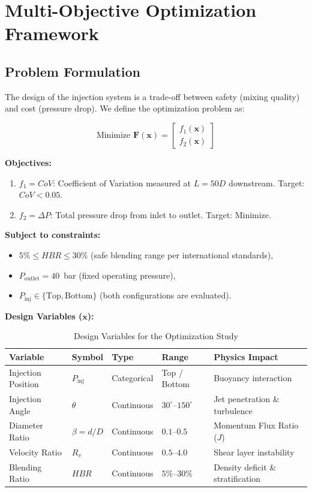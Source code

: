 \documentclass[12pt, a4paper]{report}
\begin{document}
\chapter{Multi-Objective Optimization Framework}

\section{Problem Formulation}
The design of the injection system is a trade-off between safety (mixing quality) and cost (pressure drop). We define the optimization problem as:

\begin{equation}
    \text{Minimize } \mathbf{F}(\mathbf{x}) = \begin{bmatrix} f_1(\mathbf{x}) \\ f_2(\mathbf{x}) \end{bmatrix}
\end{equation}

\noindent \textbf{Objectives:}
\begin{enumerate}
    \item $f_1 = CoV$: Coefficient of Variation measured at $L = 50D$ downstream. Target: $CoV < 0.05$.
    \item $f_2 = \Delta P$: Total pressure drop from inlet to outlet. Target: Minimize.
\end{enumerate}

\noindent \textbf{Subject to constraints:}
\begin{itemize}
    \item $5\% \leq HBR \leq 30\%$ (safe blending range per international standards),
    \item $P_{\text{outlet}} = 40$~bar (fixed operating pressure),
    \item $P_{\text{inj}} \in \{\text{Top}, \text{Bottom}\}$ (both configurations are evaluated).
\end{itemize}

\noindent \textbf{Design Variables ($\mathbf{x}$):}
\begin{table}[H]
\centering
\caption{Design Variables for the Optimization Study}
\label{tab:optim_vars}
\begin{tabular}{@{}lllll@{}}
\toprule
\textbf{Variable} & \textbf{Symbol} & \textbf{Type} & \textbf{Range} & \textbf{Physics Impact} \\ \midrule
Injection Position & $P_{\text{inj}}$ & Categorical & Top / Bottom & Buoyancy interaction \\
Injection Angle & $\theta$ & Continuous & $30^\circ$--$150^\circ$ & Jet penetration \& turbulence \\
Diameter Ratio & $\beta = d/D$ & Continuous & $0.1$--$0.5$ & Momentum Flux Ratio ($J$) \\
Velocity Ratio & $R_v$ & Continuous & $0.5$--$4.0$ & Shear layer instability \\
Blending Ratio & $HBR$ & Continuous & $5\%$--$30\%$ & Density deficit \& stratification \\ \bottomrule
\end{tabular}
\end{table}
\end{document}
